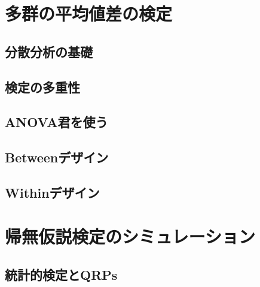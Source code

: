 \documentclass[
  a4paper,
]{ltjsbook}
\begin{document}

\hypertarget{ux591aux7fa4ux306eux5e73ux5747ux5024ux5deeux306eux691cux5b9a}{%
\chapter{多群の平均値差の検定}\label{ux591aux7fa4ux306eux5e73ux5747ux5024ux5deeux306eux691cux5b9a}}

\hypertarget{ux5206ux6563ux5206ux6790ux306eux57faux790e}{%
\section{分散分析の基礎}\label{ux5206ux6563ux5206ux6790ux306eux57faux790e}}

\hypertarget{ux691cux5b9aux306eux591aux91cdux6027}{%
\section{検定の多重性}\label{ux691cux5b9aux306eux591aux91cdux6027}}

\hypertarget{anovaux541bux3092ux4f7fux3046}{%
\section{ANOVA君を使う}\label{anovaux541bux3092ux4f7fux3046}}

\hypertarget{betweenux30c7ux30b6ux30a4ux30f3}{%
\section{Betweenデザイン}\label{betweenux30c7ux30b6ux30a4ux30f3}}

\hypertarget{withinux30c7ux30b6ux30a4ux30f3}{%
\section{Withinデザイン}\label{withinux30c7ux30b6ux30a4ux30f3}}


\hypertarget{ux5e30ux7121ux4eeeux8aacux691cux5b9aux306eux30b7ux30dfux30e5ux30ecux30fcux30b7ux30e7ux30f3}{%
\chapter{帰無仮説検定のシミュレーション}\label{ux5e30ux7121ux4eeeux8aacux691cux5b9aux306eux30b7ux30dfux30e5ux30ecux30fcux30b7ux30e7ux30f3}}

\hypertarget{ux7d71ux8a08ux7684ux691cux5b9aux3068qrps}{%
\section{統計的検定とQRPs}\label{ux7d71ux8a08ux7684ux691cux5b9aux3068qrps}}
\end{document}

